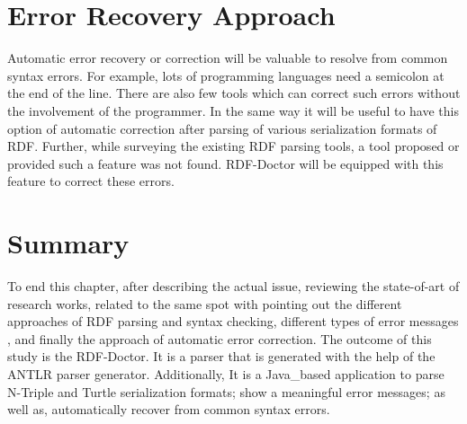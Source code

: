 \section{Error Recovery Approach}
Automatic error recovery or correction will be valuable to resolve from common syntax errors. For example, lots of programming languages need a semicolon at the end of the line. There are also few tools which can correct such errors without the involvement of the programmer. In the same way it will be useful to have this option of automatic correction after parsing of various serialization formats of RDF. Further, while surveying the existing RDF parsing tools, a tool proposed or provided such a feature was not found. RDF-Doctor will be equipped with this feature to correct these errors.   

\section{Summary}
To end this chapter, after describing the actual issue, reviewing the  state-of-art of research works, related to the same spot with pointing out  the different approaches of RDF parsing and syntax checking, different types of error messages , and finally the approach of automatic error correction. The outcome of this study is the RDF-Doctor. It is a parser that is generated with the help of the ANTLR parser generator. Additionally, It is a Java\_based application to parse N-Triple and Turtle serialization formats; show a meaningful error messages; as well as, automatically recover from common syntax errors.    










